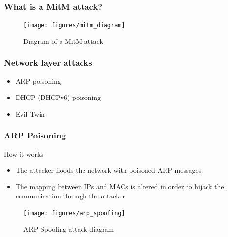 \documentclass{beamer}
\begin{document}
\begin{frame}
  \frametitle{What is a MitM attack?}
  \begin{figure}
  \texttt{[image: figures/mitm\_diagram]}
  \caption*{Diagram of a MitM attack}
  \end{figure}

\end{frame}


\begin{frame}
  \frametitle{Network layer attacks}
  \begin{block}{}
    \begin{itemize}
      \item ARP poisoning
      \item DHCP (DHCPv6) poisoning
      \item Evil Twin
    \end{itemize}
  \end{block}

\end{frame}

\begin{frame}
  \frametitle{ARP Poisoning}
  \begin{block}{How it works}
  \begin{itemize}
    \item The attacker floods the network with poisoned ARP messages 
    \item The mapping between IPs and MACs is altered in order to hijack the communication through the attacker
  \end{itemize}
\end{block}
  \begin{figure}
    \texttt{[image: figures/arp\_spoofing]}
    \caption*{ARP Spoofing attack diagram}
  \end{figure}
\end{frame}
\end{document}
